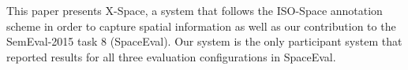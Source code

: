 This paper presents X-Space, a system that follows the ISO-Space annotation scheme in order to capture spatial information as well as our contribution to the SemEval-2015 task 8 (SpaceEval). Our system is the only participant system that reported results for all three evaluation configurations in SpaceEval.
